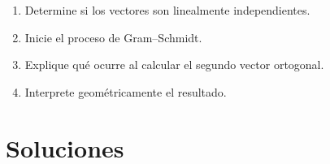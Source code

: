 \documentclass[12pt,letterpaper]{article}
\begin{document}
\begin{enumerate}[label=\textbf{\arabic*.}]
\begin{enumerate}[label=\alph*)]

\item Determine si los vectores son linealmente independientes.

\item Inicie el proceso de Gram--Schmidt.

\item Explique qué ocurre al calcular el segundo vector ortogonal.

\item Interprete geométricamente el resultado.

\end{enumerate}

\end{enumerate}


\newpage

\section*{Soluciones}
\end{document}
